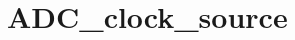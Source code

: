 \hypertarget{group___a_d_c__clock__source}{\section{A\-D\-C\-\_\-clock\-\_\-source}
\label{group___a_d_c__clock__source}
}
